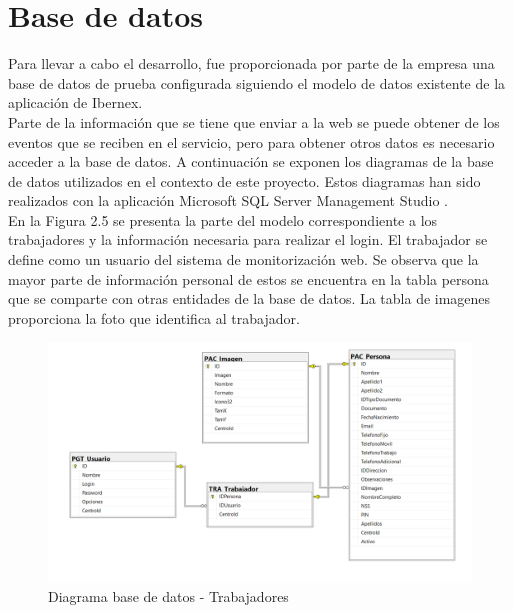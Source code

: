 \section{Base de datos}


Para llevar a cabo el desarrollo, fue proporcionada por parte de la empresa una base de datos de prueba configurada siguiendo el modelo de datos existente de la aplicación de Ibernex.\\

Parte de la información que se tiene que enviar a la web se puede obtener de los eventos que se reciben en el servicio, pero para obtener otros datos es necesario acceder a la base de datos. A continuación se exponen los diagramas de la base de datos utilizados en el contexto de este proyecto. Estos diagramas han sido realizados con la aplicación Microsoft SQL Server Management Studio \cite{sql-server-studio}. \\

En la Figura 2.5 se presenta la parte del modelo correspondiente a los trabajadores y la información necesaria para realizar el login. El trabajador se define como un usuario del sistema de monitorización web. Se observa que la mayor parte de información personal de estos se encuentra en la tabla persona que se comparte con otras entidades de la base de datos. La tabla de imagenes proporciona la foto que identifica al trabajador.

\begin{figure}[H]
    \centering
    \includegraphics[width=16cm]{Imagenes/Diagrama-BD-Login}
    \caption{Diagrama base de datos - Trabajadores}
    \label{fig:Diagrama-BD-Login}
\end{figure}

